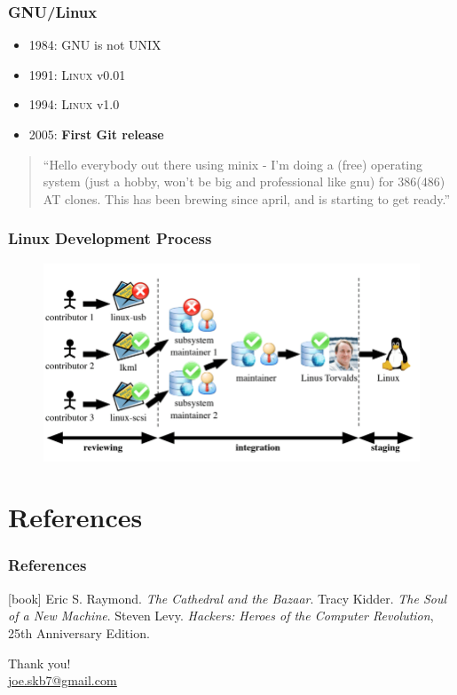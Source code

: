 \begin{frame}
  \frametitle{GNU/Linux}
  \begin{itemize}
    \item 1984: \textsc{GNU} is not \textsc{UNIX}
    \item 1991: \textsc{Linux} v0.01
    \item 1994: \textsc{Linux} v1.0
    \item 2005: \textbf{First Git release}
  \end{itemize}
  \vspace*{5mm}
  \begin{quotation}
    ``Hello everybody out there using minix -
    I'm doing a (free) operating system (just a hobby, won't be big and
    professional like gnu) for 386(486) AT clones. This has been brewing
    since april, and is starting to get ready.''
  \end{quotation}
\end{frame}

\begin{frame}
  \frametitle{Linux Development Process}
    \begin{figure}
      \centering
      \includegraphics[scale=0.4]{images/linux-dev.png}
    \end{figure}
\end{frame}

\section*{References}

\begin{frame}
  \frametitle{References}
  \begin{thebibliography}{}
  [book]
      Eric S. Raymond.
      \newblock \emph{The Cathedral and the Bazaar}.
      Tracy Kidder.
      \newblock \emph{The Soul of a New Machine}.
      Steven Levy.
     \newblock \emph{Hackers: Heroes of the Computer Revolution}, 25th
               Anniversary Edition.
  \end{thebibliography}
\end{frame}

\begin{frame}[standout]
  Thank you! \\
  \vspace{5mm}
  \href{mailto:joe.skb7@gmail.com}{\small \underline{joe.skb7@gmail.com}}
\end{frame}


